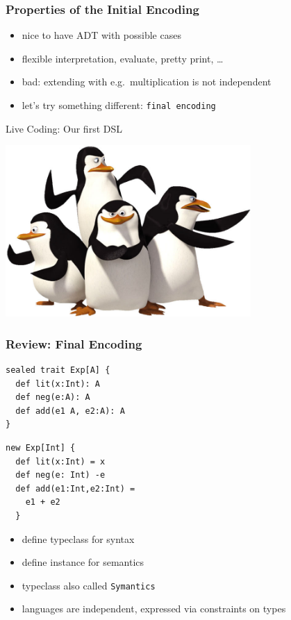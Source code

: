 \documentclass{beamer}
\begin{document}
\begin{frame}
  \frametitle{Properties of the Initial Encoding}
  \begin{itemize}
  \item nice to have ADT with possible cases
  \item flexible interpretation, evaluate, pretty print, \dots{}
  \item bad: extending with e.g.\ multiplication is not independent
  \item let's try something different: \texttt{final encoding}
  \end{itemize}
\end{frame}

\begin{frame}
  \begin{center}
    \Huge Live Coding: Our first DSL
  \end{center}
  \begin{center}
    \includegraphics[width=0.7\textwidth]{pics/penguins.jpg}
  \end{center}
\end{frame}

\begin{frame}[fragile]
  \frametitle{Review: Final Encoding}
  \begin{minipage}[frame=none]{0.45\linewidth}
\begin{verbatim}
sealed trait Exp[A] {
  def lit(x:Int): A
  def neg(e:A): A
  def add(e1 A, e2:A): A
}
\end{verbatim}
  \end{minipage}
  \begin{minipage}[frame=none]{0.45\linewidth}
\begin{verbatim}
new Exp[Int] {
  def lit(x:Int) = x
  def neg(e: Int) -e
  def add(e1:Int,e2:Int) =
    e1 + e2
  }
\end{verbatim}
  \end{minipage}
  \begin{itemize}
  \item define typeclass for syntax
  \item define instance for semantics
  \item typeclass also called \texttt{Symantics}
  \item languages are independent, expressed via constraints on types
  \end{itemize}
\end{frame}
\end{document}
